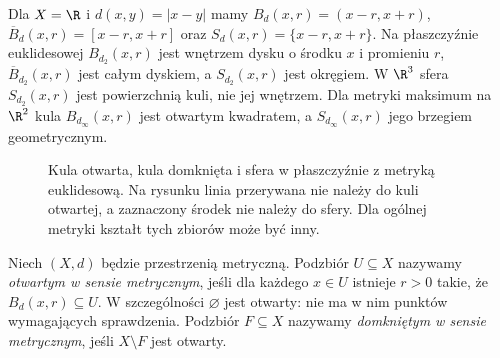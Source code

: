 \begin{przyklad}
\label{ex:topog-kule-euklidesowe}
Dla $X=\R$ i $d(x,y)=|x-y|$ mamy
$B_d(x,r)=(x-r,x+r)$,
$\overline B_d(x,r)=[x-r,x+r]$ oraz
$S_d(x,r)=\{x-r,x+r\}$.
Na płaszczyźnie euklidesowej $B_{d_2}(x,r)$ jest
wnętrzem dysku o środku $x$ i promieniu $r$,
$\overline B_{d_2}(x,r)$ jest całym dyskiem,
a $S_{d_2}(x,r)$ jest okręgiem.
W $\R^3$ sfera $S_{d_2}(x,r)$ jest powierzchnią kuli,
nie jej wnętrzem. Dla metryki maksimum na $\R^2$
kula $B_{d_\infty}(x,r)$ jest otwartym kwadratem,
a $S_{d_\infty}(x,r)$ jego brzegiem geometrycznym.
\end{przyklad}

\begin{figure}[ht]
\centering
{}
\caption{Kula otwarta, kula domknięta i sfera
w płaszczyźnie z metryką euklidesową. Na rysunku
linia przerywana nie należy do kuli otwartej, a zaznaczony
środek nie należy do sfery. Dla ogólnej metryki kształt tych
zbiorów może być inny.}
\label{fig:topog-kule-sfera}
\end{figure}

\begin{definicja}
\label{def:topog-otwarty-metrycznie}
Niech $(X,d)$ będzie przestrzenią metryczną.
Podzbiór $U\subseteq X$ nazywamy \emph{otwartym
w sensie metrycznym}, jeśli dla każdego $x\in U$
istnieje $r>0$ takie, że $B_d(x,r)\subseteq U$.
W szczególności $\varnothing$ jest otwarty:
nie ma w nim punktów wymagających sprawdzenia.
Podzbiór $F\subseteq X$ nazywamy \emph{domkniętym
w sensie metrycznym}, jeśli $X\setminus F$ jest otwarty.
\end{definicja}

